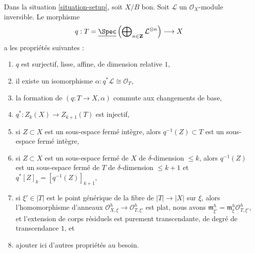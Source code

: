 \begin{lemma}
\label{lemma-Gm-torsor}
Dans la situation \ref{situation-setup}, soit $X/B$ bon. Soit
$\mathcal{L}$ un $\mathcal{O}_X$-module inversible. Le morphisme
$$
q :
T = \underline{\Spec}\left(
\bigoplus\nolimits_{n \in \mathbf{Z}} \mathcal{L}^{\otimes n}\right)
\longrightarrow
X
$$
a les propriétés suivantes :
\begin{enumerate}
\item $q$ est surjectif, lisse, affine, de dimension relative $1$,
\item il existe un isomorphisme $\alpha : q^*\mathcal{L} \cong \mathcal{O}_T$,
\item la formation de $(q : T \to X, \alpha)$ commute aux changements de
base,
\item $q^* : Z_k(X) \to Z_{k + 1}(T)$ est injectif,
\item si $Z \subset X$ est un sous-espace fermé intègre, alors $q^{-1}(Z)
\subset T$ est un sous-espace fermé intègre,
\item si $Z \subset X$ est un sous-espace fermé de $X$ de $\delta$-dimension
$\leq k$, alors $q^{-1}(Z)$ est un sous-espace fermé de $T$ de
$\delta$-dimension $\leq k + 1$ et $q^*[Z]_k = [q^{-1}(Z)]_{k + 1}$,
\item si $\xi' \in |T|$ est le point générique de la fibre de $|T| \to |X|$
sur $\xi$, alors l'homomorphisme d'anneaux $\mathcal{O}_{X, \xi}^h \to
\mathcal{O}_{T, \xi'}^h$ est plat, nous avons $\mathfrak m_{\xi'}^h =
\mathfrak m_\xi^h \mathcal{O}_{T, \xi'}^h$, et l'extension de corps résiduels
est purement transcendante, de degré de transcendance $1$, et
\item ajouter ici d'autres propriétés au besoin.
\end{enumerate}
\end{lemma}

